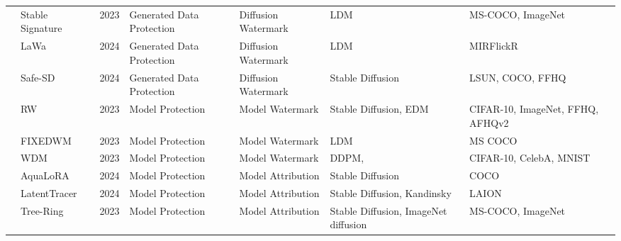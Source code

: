 \begin{table*}[htp]
{\begin{tabular}{p{}p{}p{}p{}p{}p{}p{}}
\cellcolor{white} & Stable Signature\cite{fernandez2023stable} & 2023 & Generated Data Protection & Diffusion Watermark & LDM & MS-COCO, ImageNet \\
\cellcolor{white} & LaWa\cite{rezaei2024lawa} & 2024 & Generated Data Protection & Diffusion Watermark & LDM & MIRFlickR \\
\cellcolor{white} & Safe-SD\cite{ma2024safe} & 2024 & Generated Data Protection & Diffusion Watermark & Stable Diffusion  & LSUN, COCO, FFHQ \\
\cellcolor{white} & RW\cite{zhao2023recipe} & 2023 & Model Protection & Model Watermark & Stable Diffusion, EDM & CIFAR-10, ImageNet, FFHQ, AFHQv2 \\
\cellcolor{white} & FIXEDWM\cite{liu2023watermarking} & 2023 & Model Protection & Model Watermark & LDM & MS COCO \\
\cellcolor{white} & WDM\cite{peng2023protecting} & 2023 & Model Protection & Model Watermark & DDPM, & CIFAR-10, CelebA, MNIST \\
\cellcolor{white} & AquaLoRA\cite{feng2024aqualora} & 2024 & Model Protection & Model Attribution & Stable Diffusion & COCO  \\
\cellcolor{white} & LatentTracer~\cite{wang2024trace} & 2024 & Model Protection & Model Attribution & Stable Diffusion, Kandinsky & LAION \\
\cellcolor{white} \multirow{-25}{0.1\textwidth}{Intellectual Property Protection}  & Tree-Ring\cite{wen2023tree} & 2023 & Model Protection & Model Attribution & Stable Diffusion, ImageNet diffusion & MS-COCO, ImageNet \\  
\hline

\end{tabular}
}
\end{table*}